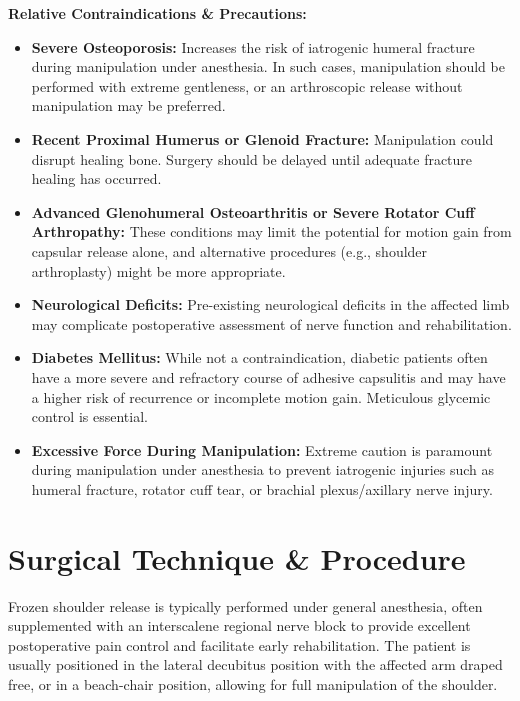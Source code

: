 \textbf{Relative Contraindications \& Precautions:}
\begin{itemize}
  \item \textbf{Severe Osteoporosis:} Increases the risk of iatrogenic humeral fracture during manipulation under anesthesia. In such cases, manipulation should be performed with extreme gentleness, or an arthroscopic release without manipulation may be preferred.
  
  \item \textbf{Recent Proximal Humerus or Glenoid Fracture:} Manipulation could disrupt healing bone. Surgery should be delayed until adequate fracture healing has occurred.
  
  \item \textbf{Advanced Glenohumeral Osteoarthritis or Severe Rotator Cuff Arthropathy:} These conditions may limit the potential for motion gain from capsular release alone, and alternative procedures (e.g., shoulder arthroplasty) might be more appropriate.
  
  \item \textbf{Neurological Deficits:} Pre-existing neurological deficits in the affected limb may complicate postoperative assessment of nerve function and rehabilitation.
  
  \item \textbf{Diabetes Mellitus:} While not a contraindication, diabetic patients often have a more severe and refractory course of adhesive capsulitis and may have a higher risk of recurrence or incomplete motion gain. Meticulous glycemic control is essential.
  
  \item \textbf{Excessive Force During Manipulation:} Extreme caution is paramount during manipulation under anesthesia to prevent iatrogenic injuries such as humeral fracture, rotator cuff tear, or brachial plexus/axillary nerve injury.
\end{itemize}

\section*{Surgical Technique \& Procedure}
Frozen shoulder release is typically performed under general anesthesia, often supplemented with an interscalene regional nerve block to provide excellent postoperative pain control and facilitate early rehabilitation. The patient is usually positioned in the lateral decubitus position with the affected arm draped free, or in a beach-chair position, allowing for full manipulation of the shoulder.

